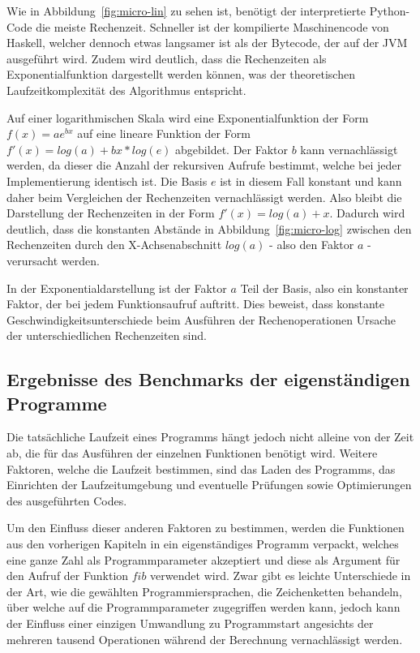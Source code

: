 \documentclass[11pt, parskip=half]{scrartcl}       %
\begin{document}
Wie in Abbildung~\ref{fig:micro-lin} zu sehen ist, benötigt der interpretierte Python-Code die meiste Rechenzeit.
Schneller ist der kompilierte Maschinencode von Haskell, welcher dennoch etwas langsamer ist als der Bytecode, der auf der JVM ausgeführt wird.
Zudem wird deutlich, dass die Rechenzeiten als Exponentialfunktion dargestellt werden können, was der theoretischen Laufzeitkomplexität des Algorithmus entspricht.

Auf einer logarithmischen Skala wird eine Exponentialfunktion der Form $f(x) = ae^{bx}$ auf eine lineare Funktion der Form $f'(x) = log(a) + bx * log(e)$ abgebildet.
Der Faktor $b$ kann vernachlässigt werden, da dieser die Anzahl der rekursiven Aufrufe bestimmt, welche bei jeder Implementierung identisch ist.
Die Basis $e$ ist in diesem Fall konstant und kann daher beim Vergleichen der Rechenzeiten vernachlässigt werden.
Also bleibt die Darstellung der Rechenzeiten in der Form $f'(x) = log(a) + x$.
Dadurch wird deutlich, dass die konstanten Abstände in Abbildung~\ref{fig:micro-log} zwischen den Rechenzeiten durch den X-Achsenabschnitt $log(a)$ - also den Faktor $a$ - verursacht werden.

In der Exponentialdarstellung ist der Faktor $a$ Teil der Basis, also ein konstanter Faktor, der bei jedem Funktionsaufruf auftritt.
Dies beweist, dass konstante Geschwindigkeitsunterschiede beim Ausführen der Rechenoperationen Ursache der unterschiedlichen Rechenzeiten sind.

\subsection{Ergebnisse des Benchmarks der eigenständigen Programme}

Die tatsächliche Laufzeit eines Programms hängt jedoch nicht alleine von der Zeit ab, die für das Ausführen der einzelnen Funktionen benötigt wird.
Weitere Faktoren, welche die Laufzeit bestimmen, sind das Laden des Programms, das Einrichten der Laufzeitumgebung und eventuelle Prüfungen sowie Optimierungen des ausgeführten Codes.

Um den Einfluss dieser anderen Faktoren zu bestimmen, werden die Funktionen aus den vorherigen Kapiteln in ein eigenständiges Programm verpackt, welches eine ganze Zahl als Programmparameter akzeptiert und diese als Argument für den Aufruf der Funktion $fib$ verwendet wird.
Zwar gibt es leichte Unterschiede in der Art, wie die gewählten Programmiersprachen, die Zeichenketten behandeln, über welche auf die Programmparameter zugegriffen werden kann, jedoch kann der Einfluss einer einzigen Umwandlung zu Programmstart angesichts der mehreren tausend Operationen während der Berechnung vernachlässigt werden.
\end{document}
